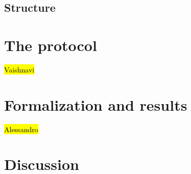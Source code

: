 \documentclass[runningheads,draft]{llncs}
\begin{document}
\subsection{Structure}
\label{sec:structure}

\section{The \mEdhoc{} protocol}
\label{sec:edhoc}
\hl{Vaishnavi}


\section{Formalization and results}
\label{sec:formalization}
\hl{Alessandro}


\section{Discussion}
\label{sec:discussion}
\end{document}
